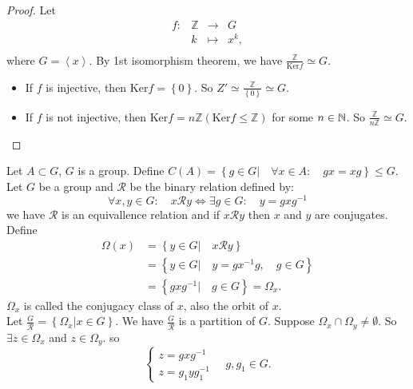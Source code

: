 \begin{proof}
Let 
\[
\begin{array}{cccc}
      f : &  \mathbb{Z}  & \longrightarrow & G \\

           &  k  & \longmapsto     & x^{k}, \\ 
\end{array}
\]
where $ G = \left\langle x \right\rangle . $ By 1st isomorphism theorem, 
we have $\frac{\mathbb{Z}}{\text{Ker}  f} \simeq G.$ 
\begin{itemize}
  \item[\ding{182}] If $f $ is injective, then $\text{Ker}  f = \left\{ 0 \right\}. $ So $Z' \simeq \frac{\mathbb{Z}}{\left\{ 0 \right\}} \simeq G $.
 \item[\ding{183}] If $f $ is not injective, then $\text{Ker}  f = n \mathbb{Z} (\text{Ker}  f \leq \mathbb{Z})  $ for 
   some $n \in  \mathbb{N} $. So $\frac{\mathbb{Z}}{n \mathbb{Z}} \simeq G$.
\end{itemize}
\end{proof}
\divider
{} Let $A \subset G $, $G $ is a group. Define $C(A)  = \left\{ g \in  G| \quad \forall x \in   A: \quad gx = xg\right\} \leq G$. 
\\
 Let $G $ be a group and $\mathcal{R}  $ be the binary relation defined by:
\[
\forall x, y \in  G: \quad x \mathcal{R} y \iff \exists g \in   G: \quad  y = gx g^{-1}
\]
we have $\mathcal{R}  $ is an equivallence relation and if $x \mathcal{R} y $ then $x $ and $y $ are conjugates. \\
 Define 
\begin{align*}
  \Omega (x)  &= \left\{ y \in  G| \quad x \mathcal{R} y\right\}   \\
              &= \left\{ y \in  G| \quad y = gx^{-1}g, \quad g \in   G \right\}
              \\
              &= \left\{ g x g^{-1}| \quad g \in  G \right\}= \Omega _{x}.
\end{align*}
$\Omega _{x} $ is called the conjugacy class of $x $, also the orbit of $x $. \\
 Let $\frac{G}{\mathcal{R}} = \left\{ \Omega _{x}|x \in  G \right\} $. We have $\frac{G}{\mathcal{R} } $ is a partition
of $G $. Suppose $\Omega _{x} \cap \Omega _{y} \neq \emptyset  $. So $\exists z \in   \Omega _{x} $ and $z \in   \Omega _{y} $. 
so 
\[
\begin{cases}
z = g x g ^{-1} \\
z = g_1 y g_1^{-1}
\end{cases}
\quad 
g, g_1 \in  G.
\]
